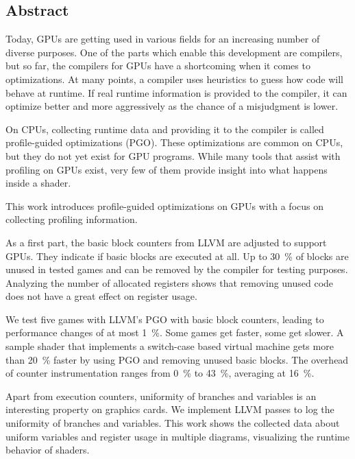 \newpage
\vspace*{3.5cm}
\begin{center}
\begin{minipage}{12.5cm}
\section*{Abstract}
Today, GPUs are getting used in various fields for an increasing number of diverse purposes.
One of the parts which enable this development are compilers, but so far, the compilers for GPUs have a shortcoming when it comes to optimizations.
At many points, a compiler uses heuristics to guess how code will behave at runtime.
If real runtime information is provided to the compiler, it can optimize better and more aggressively as the chance of a misjudgment is lower.

On CPUs, collecting runtime data and providing it to the compiler is called profile-guided optimizations (PGO).
These optimizations are common on CPUs, but they do not yet exist for GPU programs.
While many tools that assist with profiling on GPUs exist, very few of them provide insight into what happens inside a shader.

This work introduces profile-guided optimizations on GPUs with a focus on collecting profiling information.

As a first part, the basic block counters from LLVM are adjusted to support GPUs.
They indicate if basic blocks are executed at all.
Up to \SI{30}{\percent} of blocks are unused in tested games and can be removed by the compiler for testing purposes.
Analyzing the number of allocated registers shows that removing unused code does not have a great effect on register usage.

We test five games with LLVM's PGO with basic block counters, leading to performance changes of at most \SI{1}{\percent}.
Some games get faster, some get slower.
A sample shader that implements a switch-case based virtual machine gets more than \SI{20}{\percent} faster by using PGO and removing unused basic blocks.
The overhead of counter instrumentation ranges from \SI{0}{\percent} to \SI{43}{\percent}, averaging at \SI{16}{\percent}.

Apart from execution counters, uniformity of branches and variables is an interesting property on graphics cards.
We implement LLVM passes to log the uniformity of branches and variables.
This work shows the collected data about uniform variables and register usage in multiple diagrams, visualizing the runtime behavior of shaders.

\end{minipage}
\end{center}



